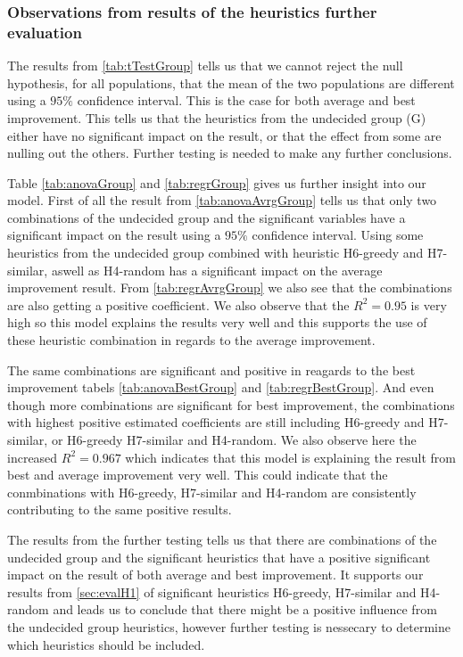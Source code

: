 \documentclass[../main.tex]{subfiles}
\begin{document}
\subsubsection{Observations from results of the heuristics further evaluation}
The results from \cref{tab:tTestGroup} tells us that we cannot reject the null hypothesis, for all populations, that the mean of the two populations are different using a $95\%$ confidence interval. This is the case for both average and best improvement.
This tells us that the heuristics from the undecided group (G) either have no significant impact on the result, or that the effect from some are nulling out the others. Further testing is needed to make any further conclusions. \par
Table \ref{tab:anovaGroup} and \cref{tab:regrGroup} gives us further insight into our model.
First of all the result from \cref{tab:anovaAvrgGroup} tells us that only two combinations of the undecided group and the significant variables have a significant impact on the result using a $95\%$ confidence interval.
Using some heuristics from the undecided group combined with heuristic H6-greedy and H7-similar, aswell as H4-random has a significant impact on the average improvement result.
From \cref{tab:regrAvrgGroup} we also see that the combinations are also getting a positive coefficient.
We also observe that the $R^2 = 0.95$ is very high so this model explains the results very well and this supports the use of these heuristic combination in regards to the average improvement.
\par
The same combinations are significant and positive in reagards to the best improvement tabels \cref{tab:anovaBestGroup} and \cref{tab:regrBestGroup}.
And even though more combinations are significant for best improvement, the combinations with highest positive estimated coefficients are still including H6-greedy and H7-similar, or H6-greedy H7-similar and H4-random.
We also observe here the increased $R^2 = 0.967$ which indicates that this model is explaining the result from best and average improvement very well.
This could indicate that the conmbinations with H6-greedy, H7-similar and H4-random are consistently contributing to the same positive results.
\par
The results from the further testing tells us that there are combinations of the undecided group and the significant heuristics that have a positive significant impact on the result of both average and best improvement. 
It supports our results from \cref{sec:evalH1} of significant heuristics H6-greedy, H7-similar and H4-random and leads us to conclude that there might be a positive influence from the undecided group heuristics, however further testing is nessecary to determine which heuristics should be included. 
\end{document}
